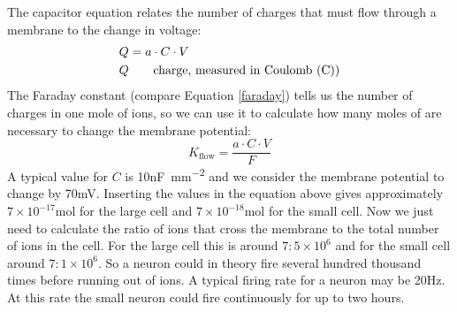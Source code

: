 The capacitor equation relates the number of charges that must flow through a membrane to the change in voltage:
\begin{align*}
Q &= a \cdot C \cdot V \\
Q &\qquad \text{charge, measured in Coulomb (\si{\coulomb))}} \\
\end{align*}
The Faraday constant (compare Equation \ref{faraday}) tells us the number of charges in one mole of ions, so we can use it to calculate how many moles of  are necessary to change the membrane potential:
\begin{equation*}
K_\mathrm{flow} = \frac{a \cdot C \cdot V}{F}
\end{equation*}
A typical value for $C$ is 10\si{\nano\farad\per\square\milli\meter} and we consider the membrane potential to change by 70\si{mV}. Inserting the values in the equation above gives approximately $7 \times 10^{-17}\si{\mole}$ for the large cell and $7 \times 10^{-18}\si{\mole}$ for the small cell. Now we just need to calculate the ratio of ions that cross the membrane to the total number of ions in the cell. For the large cell this is around $7:5\times 10^6$ and for the small cell around $7:1\times 10^6$. So a neuron could in theory fire several hundred thousand times before running out of ions. A typical firing rate for a neuron may be 20\si{\hertz}. At this rate the small neuron could fire continuously for up to two hours.